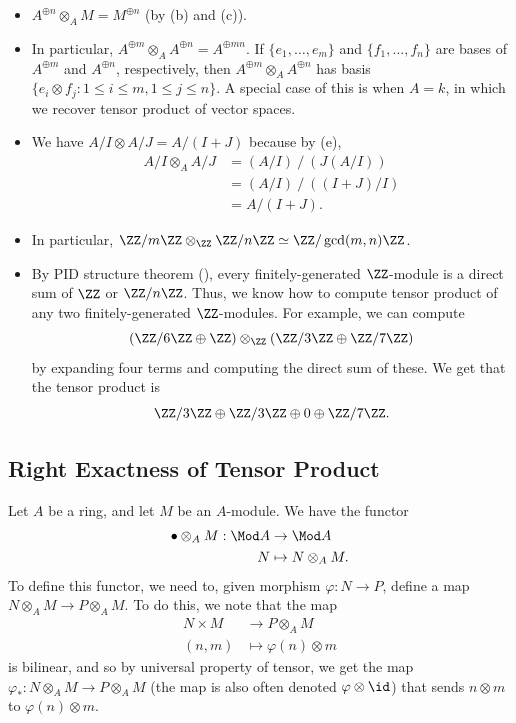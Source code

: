 \begin{example}
    \begin{itemize}
    \item $A^{\oplus n}\otimes_A M = M^{\oplus n}$ (by  (b) and (c)).
    \item In particular, $A^{\oplus m} \otimes_A A^{\oplus n}
    = A^{\oplus mn}$. 
    If $\{e_1,\dots,e_m\}$ and $\{f_1,\dots,f_n\}$
    are bases of $A^{\oplus m}$ and $A^{\oplus n}$, respectively,
    then $A^{\oplus m}\otimes_A A^{\oplus n}$
    has basis $\{e_i\otimes f_j : 1\leq i\leq m, 
    1\leq j\leq n\}$.
    A special case of this is when $A=k$,
    in which we recover tensor product of vector spaces.
    \item We have 
	$A/I\otimes A/J = A/(I+J)$ because by 
         (e),
	\begin{align*}
        A/I\otimes_A A/J &= (A/I)\ /\ (J(A/I)) \\
	&= (A/I)\ /\ ((I+J)/I) \\
        &= A/(I+J).
        \end{align*}
    \item In particular, 
        $\ZZ/m\ZZ \otimes_\ZZ \ZZ/n\ZZ \simeq 
        \ZZ/\gcd(m,n)\ZZ$.
        
    \item By PID structure theorem (), every finitely-generated $\ZZ$-module is a direct sum of 
        $\ZZ$ or $\ZZ/n\ZZ$. 
        Thus, we know how to compute tensor product of any two finitely-generated $\ZZ$-modules.
        For example,
        we can compute
    $$(\ZZ/6\ZZ \oplus \ZZ) \otimes_\ZZ
    (\ZZ/3\ZZ \oplus \ZZ/7\ZZ)$$
    by expanding four terms and computing the direct
    sum of these. We get that the tensor product is
    $$\ZZ/3\ZZ \oplus \ZZ/3\ZZ \oplus 0 \oplus \ZZ/7\ZZ.$$
    \end{itemize}
\end{example}
%
%
%
%
%
\subsection{Right Exactness of Tensor Product}
Let $A$ be a ring, and let $M$ be an $A$-module.
We have the functor
\begin{align*}
    \bullet \otimes_A M : \Mod A &\to \Mod A \\
    N &\mapsto N\otimes_A M.
\end{align*}
%
To define this functor, we need to, given 
morphism $\varphi : N\to P$, define a map
$N\otimes_A M\to P\otimes_A M$. 
To do this, we note that the map 
\begin{align*}
    N\times M &\to P\otimes_A M \\
    (n,m) &\mapsto \varphi(n)\otimes m
\end{align*}
is bilinear, and so by universal property of tensor,
we get the map $\varphi_* : N\otimes_A M\to P\otimes_A M$
(the map is also often denoted $\varphi\otimes\id$)
that sends $n\otimes m$ to $\varphi(n)\otimes m$.


